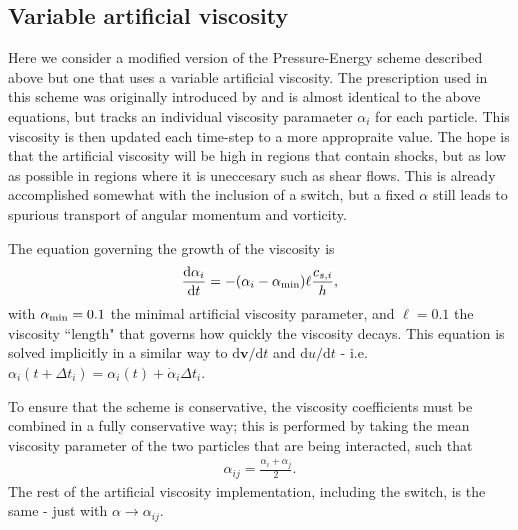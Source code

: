 
\subsection{Variable artificial viscosity}

Here we consider a modified version of the Pressure-Energy scheme described
above but one that uses a variable artificial viscosity. The prescription used
in this scheme was originally introduced by \citet{Morris1997} and is almost
identical to the above equations, but tracks an individual viscosity paramaeter
$\alpha_i$ for each particle. This viscosity is then updated each time-step to
a more appropraite value. The hope is that the artificial viscosity will be
high in regions that contain shocks, but as low as possible in regions where it
is uneccesary such as shear flows. This is already accomplished somewhat with
the inclusion of a \citet{Balsara1995} switch, but a fixed $\alpha$ still leads
to spurious transport of angular momentum and vorticity.

The equation governing the growth of the viscosity is
\begin{align}
  \frac{\mathrm{d} \alpha_i}
       {\mathrm{d} t} = 
  - (\alpha_i - \alpha_{\rm min}) \ell \frac{c_{s, i}}{h},
  \label{eq:sph:pu:alphadt}
\end{align}
with $\alpha_{\rm min}=0.1$ the minimal artificial viscosity parameter, and
$\ell=0.1$ the viscosity ``length" that governs how quickly the viscosity
decays. This equation is solved implicitly in a similar way to
$\mathrm{d}\mathbf{v}/ \mathrm{d}t$ and $\mathrm{d}u/\mathrm{d}t$ - i.e.
$\alpha_{i} (t+\Delta t_i) = \alpha_{i}(t) + \dot{\alpha}_i \Delta t_i$.

To ensure that the scheme is conservative, the viscosity coefficients must be
combined in a fully conservative way; this is performed by taking the mean
viscosity parameter of the two particles that are being interacted, such that
\begin{align}
  \alpha_{ij} = \frac{\alpha_i + \alpha_j}{2}.
\end{align}
The rest of the artificial viscosity implementation, including the
\citet{Balsara1995} switch, is the same - just with $\alpha \rightarrow
\alpha_{ij}$.

